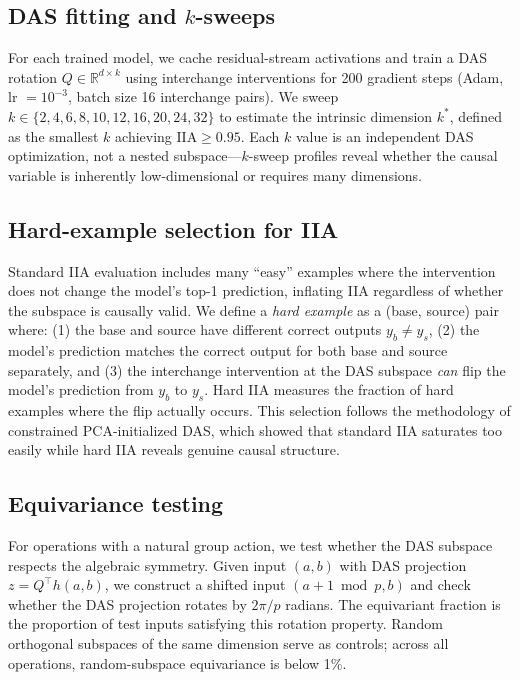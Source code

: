 \documentclass{article}
\newcommand{\IIA}{\mathrm{IIA}}
\newcommand{\R}{\mathbb{R}}
\begin{document}
\subsection{DAS fitting and $k$-sweeps}

For each trained model, we cache residual-stream activations and train a DAS
rotation $Q \in \R^{d \times k}$ using interchange interventions for 200
gradient steps (Adam, lr $= 10^{-3}$, batch size 16 interchange pairs).
We sweep $k \in \{2, 4, 6, 8, 10, 12, 16, 20, 24, 32\}$ to
estimate the intrinsic dimension $k^*$, defined as the smallest $k$ achieving
$\IIA \geq 0.95$. Each $k$ value is an independent DAS optimization, not a
nested subspace---$k$-sweep profiles reveal whether the causal variable is
inherently low-dimensional or requires many dimensions.

\subsection{Hard-example selection for IIA}
\label{sec:hard_examples}

Standard IIA evaluation includes many ``easy'' examples where the intervention
does not change the model's top-1 prediction, inflating IIA regardless of whether
the subspace is causally valid. We define a \emph{hard example} as a
(base, source) pair where: (1) the base and source have different correct outputs
$y_b \neq y_s$, (2) the model's prediction matches the correct output for both
base and source separately, and (3) the interchange intervention at the DAS
subspace \emph{can} flip the model's prediction from $y_b$ to $y_s$. Hard IIA
measures the fraction of hard examples where the flip actually occurs. This
selection follows the methodology of constrained PCA-initialized DAS,
which showed that standard IIA saturates too easily while hard IIA reveals
genuine causal structure.

\subsection{Equivariance testing}

For operations with a natural group action, we test whether the DAS subspace
respects the algebraic symmetry. Given input $(a, b)$ with DAS projection
$z = Q^\top h(a,b)$, we construct a shifted input $(a{+}1 \bmod p, b)$ and
check whether the DAS projection rotates by $2\pi/p$ radians. The equivariant
fraction is the proportion of test inputs satisfying this rotation property.
Random orthogonal subspaces of the same dimension serve as controls; across all
operations, random-subspace equivariance is below 1\%.
\end{document}
